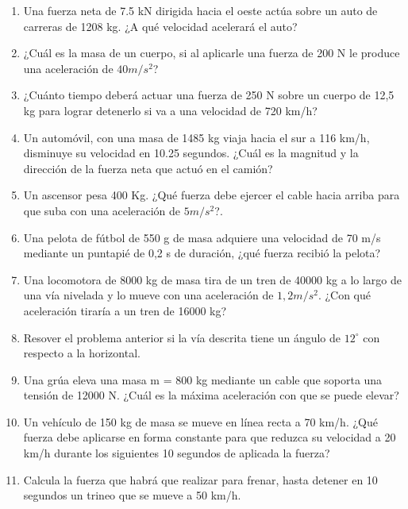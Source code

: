 \documentclass[a5paper,pagesize,10pt,bibtotoc,pointlessnumbers,
normalheadings,DIV=9,fleqn,x11names,table,twoside=false]{scrbook}
\begin{document}
\begin{enumerate}
 \item Una fuerza neta de 7.5 kN dirigida hacia el oeste actúa sobre un auto de carreras de 1208 kg. ¿A qué velocidad acelerará 
el auto?

\item  ¿Cuál es la masa de un cuerpo, si
 al aplicarle una fuerza de 200 N le produce una aceleración de $40 m/s^2$?

\item  ¿Cuánto tiempo deberá actuar
 una fuerza de 250 N sobre un cuerpo de 12,5 kg para lograr detenerlo si va a una velocidad 
de
 720 km/h?

 \item Un automóvil, con una masa de 1485 kg viaja hacia el sur a 116 km/h, disminuye su velocidad en 10.25 segundos. ¿Cuál es la 
magnitud y la dirección de la fuerza neta que actuó en el camión?

\item Un ascensor pesa 400 Kg. ¿Qué fuerza debe ejercer el cable hacia arriba para que suba con una aceleración de $5 m/s^2$?.

\item Una pelota de fútbol de 550 g de masa adquiere una
 velocidad de 70 m/s mediante un puntapié de 0,2 s de duración, ¿qué 
fuerza recibió la pelota?

\item Una locomotora de 8000 kg de masa tira de un tren de 40000 kg a lo largo de una vía nivelada y lo mueve con una aceleración 
de $1,2 m/s^2$. ¿Con qué aceleración tiraría a un tren de 16000 kg?

\item Resover el problema anterior si la vía descrita tiene un ángulo de $12^\circ$ con respecto a la horizontal.

\item  Una grúa eleva una masa m = 800 kg
 mediante un cable que soporta una tensión de 12000 N. ¿Cuál es la máxima aceleración 
con que
 se puede elevar?

\item Un vehículo de 150 kg de masa se mueve en línea recta a 70 km/h. ¿Qué fuerza debe aplicarse en forma constante para que 
reduzca su velocidad a 20 km/h durante los siguientes 10 segundos de aplicada la fuerza?

\item Calcula la fuerza que habrá que realizar para frenar, hasta detener en 10 segundos un trineo que se mueve a 50 km/h.


\end{enumerate}
\end{document}
